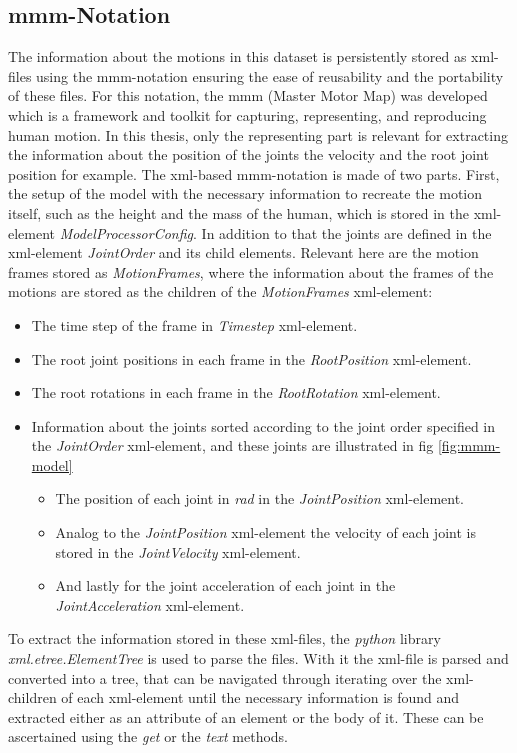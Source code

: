 		\subsection{mmm-Notation} \label{subsec:mmm-notation}
			The information about the motions in this dataset is persistently stored as xml-files using the mmm-notation ensuring the ease of reusability and the portability of these files. For this notation, the mmm (Master Motor Map) was developed which is a framework and toolkit for capturing, representing, and reproducing human motion. In this thesis, only the representing part is relevant for extracting the information about the position of the joints the velocity and the root joint position for example\cite{mmm2014}. The xml-based mmm-notation is made of two parts. First, the setup of the model with the necessary information to recreate the motion itself, such as the height and the mass of the human, which is stored in the xml-element \textit{ModelProcessorConfig}. In addition to that the joints are defined in the xml-element \textit{JointOrder} and its child elements. Relevant here are the motion frames stored as \textit{MotionFrames}, where the information about the frames of the motions are stored as the children of the \textit{MotionFrames} xml-element:
			\begin{itemize}
				\item The time step of the frame in \textit{Timestep} xml-element.
				\item The root joint positions in each frame in the \textit{RootPosition} xml-element.
				\item The root rotations in each frame in the \textit{RootRotation} xml-element.
				\item Information about the joints sorted according to the joint order specified in the \textit{JointOrder} xml-element, and these joints are illustrated in fig \ref{fig:mmm-model}
				\begin{itemize}
					\item The position of each joint in \textit{rad} in the \textit{JointPosition} xml-element.
					\item Analog to the \textit{JointPosition} xml-element the velocity of each joint is stored in the \textit{JointVelocity} xml-element.
					\item And lastly for the joint acceleration of each joint in the \\\textit{JointAcceleration} xml-element.
				\end{itemize}
			\end{itemize}
			To extract the information stored in these xml-files, the \textit{python} library \\\textit{xml.etree.ElementTree} is used to parse the files. With it the xml-file is parsed and converted into a tree, that can be navigated through iterating over the xml-children of each xml-element until the necessary information is found and extracted either as an attribute of an element or the body of it. These can be ascertained using the \textit{get} or the \textit{text} methods. 
